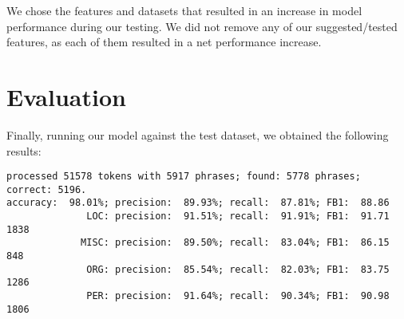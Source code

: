 \documentclass{article}
\begin{document}
We chose the features and datasets that resulted in an increase in model performance during our testing.
We did not remove any of our suggested/tested features, as each of them resulted in a net performance increase.

\section{Evaluation}
Finally, running our model against the test dataset, we obtained the following results:

\begin{verbatim}
processed 51578 tokens with 5917 phrases; found: 5778 phrases; correct: 5196.
accuracy:  98.01%; precision:  89.93%; recall:  87.81%; FB1:  88.86
              LOC: precision:  91.51%; recall:  91.91%; FB1:  91.71  1838
             MISC: precision:  89.50%; recall:  83.04%; FB1:  86.15  848
              ORG: precision:  85.54%; recall:  82.03%; FB1:  83.75  1286
              PER: precision:  91.64%; recall:  90.34%; FB1:  90.98  1806
\end{verbatim}
\end{document}
